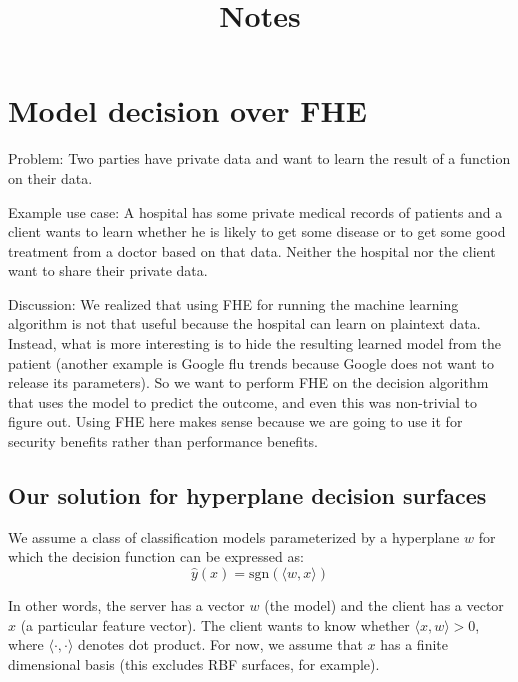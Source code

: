 \documentclass[11pt]{article}
\title{Notes}
\begin{document}
\date{}

\maketitle

\vspace{-2cm}


\section{Model decision over FHE}

Problem: Two parties have private data and want to learn the result of a function on their data.

\noindent Example use case:  A hospital  has some private medical records of patients and a client wants to learn whether he is likely to get some disease or to get some good treatment from a doctor based on that data. Neither the hospital nor the client want to share their private data.

Discussion:
We realized that using FHE for running the machine learning algorithm is not that useful because the hospital can learn on plaintext data. Instead, what is more interesting is to hide the resulting learned model from the patient (another example is Google flu trends because Google does not want to release its parameters). So we want to perform FHE on the decision algorithm that uses the model to predict the outcome, and even this was non-trivial to figure out.
Using FHE here makes sense because we are going to use it for security benefits rather than performance benefits.


\subsection{Our solution for hyperplane decision surfaces}
\label{sub:hyperplane_decision}      

\newcommand{\res}{\mathsf{res}}

We assume a class of classification models parameterized by a hyperplane $w$
for which the decision function can be expressed as:
\begin{equation*}
  \hat{y}(x) = \text{sgn}(\langle w, x \rangle) 
\end{equation*}

In other words, the server has a vector $w$ (the model) and the client has a
vector $x$ (a particular feature vector). The client wants to know whether
$\langle x, w \rangle > 0$, where $\langle \cdot, \cdot \rangle$ denotes dot product. For
now, we assume that $x$ has a finite dimensional basis (this excludes RBF
surfaces, for example).
\end{document}
